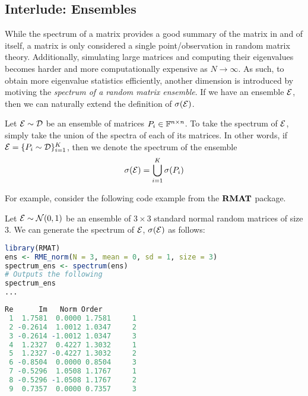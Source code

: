 \newpage
\subsection{Interlude: Ensembles}
While the spectrum of a matrix provides a good summary of the matrix in and of itself, a matrix is only considered a single point/observation in random matrix theory.
Additionally, simulating large matrices and computing their eigenvalues becomes harder and more computationally expensive as $N \to \infty$.
As such, to obtain more eigenvalue statistics efficiently, another dimension is introduced by motiving the \textit{spectrum of a random matrix ensemble}.
If we have an ensemble $\mathcal{E}$, then we can naturally extend the definition of $\sigma(\mathcal{E})$.

\begin{definition}
Let $\mathcal{E} \sim \mathcal{D}$ be an ensemble of matrices $P_i \in \mathbb{F}^{n \times n}$. To take the spectrum of $\mathcal{E}$, simply take the union of the spectra of each of its matrices.
In other words, if $\mathcal{E} = \{P_i \sim \mathcal{D}\}_{i = 1}^K$, then we denote the spectrum of the ensemble
$$\sigma(\mathcal{E}) = \bigcup_{i=1}^K \sigma(P_i)$$
\end{definition}

\medskip
For example, consider the following code example from the ${\textbf{RMAT}}$ package.
\begin{code}
Let $\mathcal{E} \sim \mathcal{N}(0,1)$ be an ensemble of $3 \times 3$ standard normal random matrices of size $3$. We can generate the spectrum of $\mathcal{E}$, $\sigma(\mathcal{E})$ as follows:
\end{code}

\begin{lstlisting}[language=R]
library(RMAT)
ens <- RME_norm(N = 3, mean = 0, sd = 1, size = 3)
spectrum_ens <- spectrum(ens)
# Outputs the following
spectrum_ens
...
\end{lstlisting}

\begin{lstlisting}[language=R]
        Re      Im   Norm Order
 1  1.7581  0.0000 1.7581     1
 2 -0.2614  1.0012 1.0347     2
 3 -0.2614 -1.0012 1.0347     3
 4  1.2327  0.4227 1.3032     1
 5  1.2327 -0.4227 1.3032     2
 6 -0.8504  0.0000 0.8504     3
 7 -0.5296  1.0508 1.1767     1
 8 -0.5296 -1.0508 1.1767     2
 9  0.7357  0.0000 0.7357     3
\end{lstlisting}

